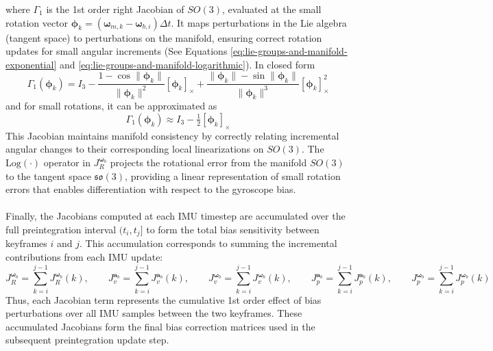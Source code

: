 where $\Gamma_1$ is the 1st order right Jacobian of $SO(3)$, evaluated at the small rotation vector $\boldsymbol{\phi}_k = (\boldsymbol{\omega}_{m,k} - \boldsymbol{\omega}_{b,i})\Delta t$. It maps perturbations in the Lie algebra (tangent space) to perturbations on the manifold, ensuring correct rotation updates for small angular increments (See Equations \ref{eq:lie-groups-and-manifold-exponential} and \ref{eq:lie-groups-and-manifold-logarithmic}). In closed form
$$
    \Gamma_1(\boldsymbol{\phi}_k) = I_3 - \frac{1 - \cos\|\boldsymbol{\phi}_k\|}{\|\boldsymbol{\phi}_k\|^2}[\boldsymbol{\phi}_k]_\times + \frac{\|\boldsymbol{\phi}_k\| - \sin\|\boldsymbol{\phi}_k\|}{\|\boldsymbol{\phi}_k\|^3}[\boldsymbol{\phi}_k]_\times^2
$$
and for small rotations, it can be approximated as
$$
    \Gamma_1(\boldsymbol{\phi}_k) \approx I_3 - \tfrac{1}{2}[\boldsymbol{\phi}_k]_\times
$$
This Jacobian maintains manifold consistency by correctly relating incremental angular changes to their corresponding local linearizations on $SO(3)$. The $\text{Log}(\cdot)$ operator in $J_R^{\boldsymbol{\omega}_b}$ projects the rotational error from the manifold $SO(3)$ to the tangent space $\mathfrak{so}(3)$, providing a linear representation of small rotation errors that enables differentiation with respect to the gyroscope bias.
\\ \\
Finally, the Jacobians computed at each IMU timestep are accumulated over the full preintegration interval $(t_i, t_j]$ to form the total bias sensitivity between keyframes $i$ and $j$. This accumulation corresponds to summing the incremental contributions from each IMU update:
$$
    J_R^{\boldsymbol{\omega}_b} = \sum_{k=i}^{j-1} J_R^{\boldsymbol{\omega}_b}(k), \qquad
    J_v^{\mathbf{a}_b} = \sum_{k=i}^{j-1} J_v^{\mathbf{a}_b}(k), \qquad
    J_v^{\boldsymbol{\omega}_b} = \sum_{k=i}^{j-1} J_v^{\boldsymbol{\omega}_b}(k), \qquad
    J_p^{\mathbf{a}_b} = \sum_{k=i}^{j-1} J_p^{\mathbf{a}_b}(k), \qquad
    J_p^{\boldsymbol{\omega}_b} = \sum_{k=i}^{j-1} J_p^{\boldsymbol{\omega}_b}(k)
$$
Thus, each Jacobian term represents the cumulative 1st order effect of bias perturbations over all IMU samples between the two keyframes. These accumulated Jacobians form the final bias correction matrices used in the subsequent preintegration update step.



